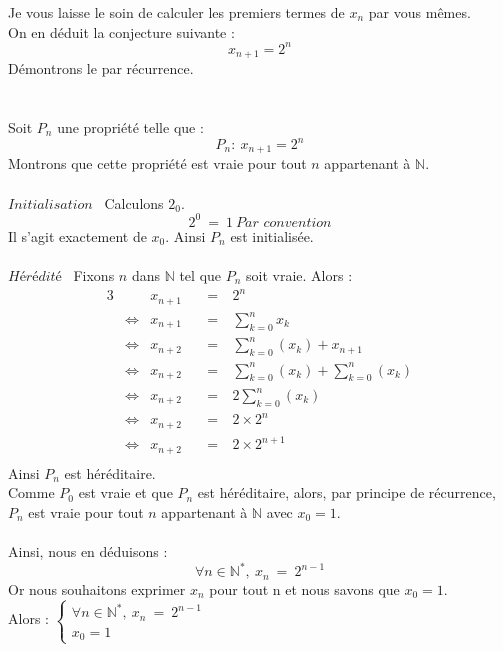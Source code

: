 \documentclass[a4paper,fleqn]{article}
\date{\today}
\begin{document}
Je vous laisse le soin de calculer les premiers termes de $x_n$ par vous mêmes. \\
On en déduit la conjecture suivante :
\[
	x_{n+1}=2^n
\]
Démontrons le par récurrence. \\
\\ \\
Soit $P_n$ une propriété telle que :
\[
	P_n:~ x_{n+1}=2^n
\]
Montrons que cette propriété est vraie pour tout $n$ appartenant à $\mathbb{N}$. \\ \\
$\textit{Initialisation}$~ Calculons $2_0$.
\[
	2^0 ~=~ 1 ~\textit{Par convention} 
\]
Il s'agit exactement de $x_0$. Ainsi $P_n$ est initialisée. \\ \\
$\textit{Hérédité}$~ Fixons $n$ dans $\mathbb{N}$ tel que $P_n$ soit vraie.
Alors :
\begin{alignat*}{3}
	&&x_{n+1}&&~=~&2^n \\
	&\Leftrightarrow&x_{n+1}&&~=~&\displaystyle\sum^n_{k=0}x_k \\
	&\Leftrightarrow&x_{n+2}&&~=~&\displaystyle\sum^n_{k=0}(x_k)+x_{n+1} \\
	&\Leftrightarrow&x_{n+2}&&~=~&\displaystyle\sum^n_{k=0}(x_k)+\displaystyle\sum^n_{k=0}(x_k) \\
	&\Leftrightarrow&x_{n+2}&&~=~&2\displaystyle\sum^n_{k=0}(x_k) \\
	&\Leftrightarrow&x_{n+2}&&~=~&2\times 2^n \\
	&\Leftrightarrow&x_{n+2}&&~=~&2\times 2^{n+1} \\
\end{alignat*}
Ainsi $P_n$ est héréditaire. \\
Comme $P_0$ est vraie et que $P_n$ est héréditaire, alors, par principe de récurrence, $P_n$ est vraie pour tout $n$ appartenant à $\mathbb{N}$ avec $x_0 = 1$. \\ \\
Ainsi, nous en déduisons :
\[
	\forall n\in\mathbb{N}^*,~x_n~=~2^{n-1}
\]
Or nous souhaitons exprimer $x_n$ pour tout n et nous savons que $x_0 = 1$. \\
Alors :
$\begin{cases}
	\forall n \in\mathbb{N}^*,~x_n~=~2^{n-1} \\
	x_0 = 1
\end{cases}$
\end{document}
